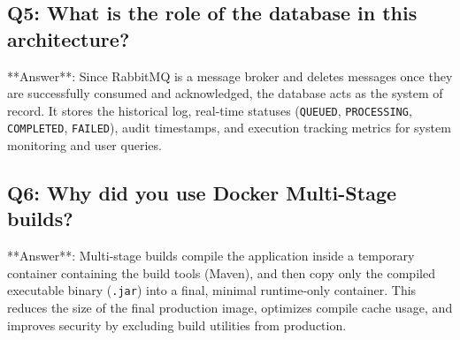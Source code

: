 \documentclass[11pt,a4paper]{article}
\begin{document}
\subsection*{Q5: What is the role of the database in this architecture?}
**Answer**: Since RabbitMQ is a message broker and deletes messages once they are successfully consumed and acknowledged, the database acts as the system of record. It stores the historical log, real-time statuses (\texttt{QUEUED}, \texttt{PROCESSING}, \texttt{COMPLETED}, \texttt{FAILED}), audit timestamps, and execution tracking metrics for system monitoring and user queries.

\subsection*{Q6: Why did you use Docker Multi-Stage builds?}
**Answer**: Multi-stage builds compile the application inside a temporary container containing the build tools (Maven), and then copy only the compiled executable binary (\texttt{.jar}) into a final, minimal runtime-only container. This reduces the size of the final production image, optimizes compile cache usage, and improves security by excluding build utilities from production.
\end{document}
